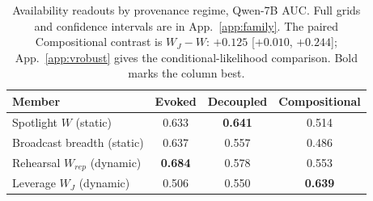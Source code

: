 \begin{table}[t]
\centering
\caption{Availability readouts by provenance regime, Qwen-7B AUC.
Full grids and confidence intervals are in App.~\ref{app:family}.
The paired Compositional contrast is $W_J{-}W$: $+0.125$
[$+0.010$, $+0.244$]; App.~\ref{app:vrobust} gives the
conditional-likelihood comparison. Bold marks the column best.}
\label{tab:family}
\small
\begin{tabular}{lccc}
\toprule
Member & Evoked & Decoupled & Compositional \\
\midrule
Spotlight $W$ (static) & 0.633 & \textcolor{gain}{\textbf{0.641}} & 0.514 \\
Broadcast breadth (static) & 0.637 & 0.557 & 0.486 \\
Rehearsal $W_{rep}$ (dynamic) & \textcolor{gain}{\textbf{0.684}} & 0.578 & 0.553 \\
Leverage $W_{J}$ (dynamic) & 0.506 & 0.550 & \textcolor{gain}{\textbf{0.639}} \\
\bottomrule
\end{tabular}
\end{table}
